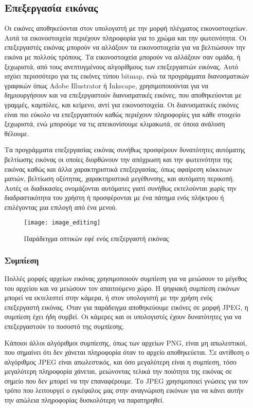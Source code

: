 \subsection{Επεξεργασία εικόνας}
Οι εικόνες αποθηκεύονται στον υπολογιστή με την μορφή πλέγματος εικονοστοιχείων. Αυτά τα εικονοστοιχεία περιέχουν πληροφορία για το χρώμα και την φωτεινότητα. Οι επεξεργαστές εικόνας μπορούν να αλλάξουν τα εικονοστοιχεία για να βελτιώσουν την εικόνα με πολλούς τρόπους. Τα εικονοστοιχεία μπορούν να αλλάξουν σαν ομάδα, ή ξεχωριστά, από τους ανεπτυγμένους αλγορίθμους των επεξεργαστών εικόνας. Αυτό ισχύει περισσότερο για τις εικόνες τύπου bitmap, ενώ τα προγράμματα διανυσματικών γραφικών όπως Adobe Illustrator ή Inkscape, χρησιμοποιούνται για να δημιουργήσουν και να επεξεργαστούν διανυσματικές εικόνες, που αποθηκεύονται με γραμμές, καμπύλες, και κείμενο, αντί για εικονοστοιχεία. Οι διανυσματικές εικόνες είναι πιο εύκολο να επεξεργαστούν καθώς περιέχουν πληροφορίες για κάθε στοιχείο ξεχωριστά, ενώ μπορούμε να τις απεικονίσουμε κλιμακωτά, σε όποια ανάλυση θέλουμε.

Τα προγράμματα επεξεργασίας εικόνας συνήθως προσφέρουν δυνατότητες αυτόματης βελτίωσης εικόνας οι οποίες διορθώνουν την απόχρωση και την φωτεινότητα της εικόνας καθώς και άλλα χαρακτηριστικά επεξεργασίας, όπως αφαίρεση κόκκινων ματιών, βελτίωση οξύτητας, χαρακτηριστικά μεγέθυνσης, και αυτόματη περικοπή. Αυτές οι διαδικασίες ονομάζονται αυτόματες γιατί συνήθως εκτελούνται χωρίς την διαδραστικότητα του χρήστη ή προσφέρονται με ένα πάτημα ενός πλήκτρου ή επιλέγοντας μια επιλογή από ένα μενού.

\begin{figure}[h]
\centering
\texttt{[image: image\_editing]}
\caption{Παράδειγμα οπτικών εφέ ενός επεξεργαστή εικόνας}
\end{figure}

\subsubsection{Συμπίεση}
Πολλές μορφές αρχείων εικόνας χρησιμοποιούν συμπίεση για να μειώσουν το μέγεθος του αρχείου και να μειώσουν τον απαιτούμενο χώρο. Η ψηφιακή συμπίεση εικόνων μπορεί να εκτελεστεί στην κάμερα, ή στον υπολογιστή με την χρήση ενός επεξεργαστή εικόνας. Όταν για παράδειγμα αποθηκεύουμε εικόνες σε μορφή JPEG, η συμπίεση έχει ήδη συμβεί. Οι κάμερες και οι υπολογιστές έχουν δυνατότητες για να επεξεργαστούν το ποσοστό της συμπίεσης.

Κάποιοι άλλοι αλγόριθμοι συμπίεσης, όπως των αρχείων PNG, είναι μη απωλεστικοί, που σημαίνει ότι δεν χάνεται πληροφορία όταν το αρχείο αποθηκεύεται. Σε αντίθεση ο αλγόριθμος JPEG είναι απωλεστικός, και όσο μεγαλύτερη είναι η συμπίεση, τόσο μεγαλύτερη πληροφορία χάνεται, μειώνοντας τελικά την ποιότητα της εικόνας σε σημείο που δεν μπορεί να την επαναφέρουμε. Το JPEG χρησιμοποιεί γνώσεις για τον τρόπο που λειτουργεί ο εγκέφαλος μας στην αναγνώριση εικόνων για να κάνει αυτήν την απώλεια πληροφορίας δυσκολότερη να παρατηρηθεί.

